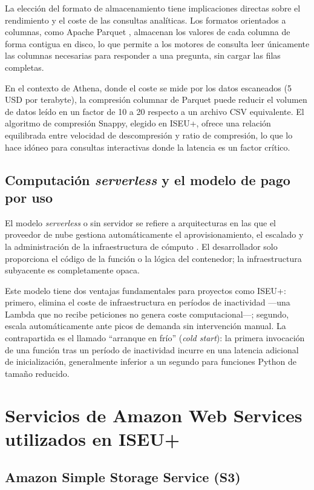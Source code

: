 La elección del formato de almacenamiento tiene implicaciones directas sobre el rendimiento y el coste de las consultas analíticas. Los formatos orientados a columnas, como Apache Parquet \parencite{Apache2023Parquet}, almacenan los valores de cada columna de forma contigua en disco, lo que permite a los motores de consulta leer únicamente las columnas necesarias para responder a una pregunta, sin cargar las filas completas.

En el contexto de Athena, donde el coste se mide por los datos escaneados (5 USD por terabyte), la compresión columnar de Parquet puede reducir el volumen de datos leído en un factor de 10 a 20 respecto a un archivo CSV equivalente. El algoritmo de compresión Snappy, elegido en ISEU+, ofrece una relación equilibrada entre velocidad de descompresión y ratio de compresión, lo que lo hace idóneo para consultas interactivas donde la latencia es un factor crítico.

\subsection{Computación \textit{serverless} y el modelo de pago por uso}

El modelo \textit{serverless} o sin servidor se refiere a arquitecturas en las que el proveedor de nube gestiona automáticamente el aprovisionamiento, el escalado y la administración de la infraestructura de cómputo \parencite{Roberts2018ServerlessArchitectures}. El desarrollador solo proporciona el código de la función o la lógica del contenedor; la infraestructura subyacente es completamente opaca.

Este modelo tiene dos ventajas fundamentales para proyectos como ISEU+: primero, elimina el coste de infraestructura en períodos de inactividad —una Lambda que no recibe peticiones no genera coste computacional—; segundo, escala automáticamente ante picos de demanda sin intervención manual. La contrapartida es el llamado ``arranque en frío'' (\textit{cold start}): la primera invocación de una función tras un período de inactividad incurre en una latencia adicional de inicialización, generalmente inferior a un segundo para funciones Python de tamaño reducido.

\section{Servicios de Amazon Web Services utilizados en ISEU+}

\subsection{Amazon Simple Storage Service (S3)}

